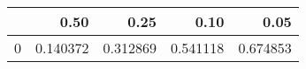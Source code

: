 \begin{tabular}{lrrrr}
\toprule
{} &      0.50 &      0.25 &      0.10 &      0.05 \\
\midrule
0 &  0.140372 &  0.312869 &  0.541118 &  0.674853 \\
\bottomrule
\end{tabular}
